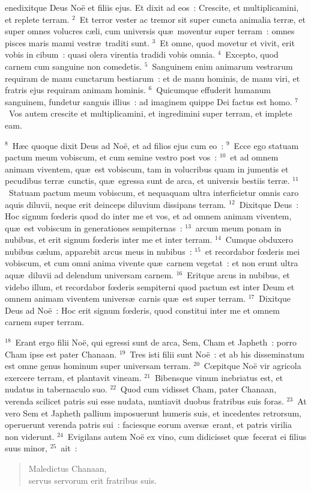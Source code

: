 \bchapter
{}enedixitque Deus No\"e et filiis ejus. Et dixit ad eos~: Crescite, et multiplicamini, et replete terram.
${}^{2}$~Et terror vester ac tremor sit super cuncta animalia terr\ae , et super omnes volucres c\ae li, cum universis qu\ae\ moventur super terram~: omnes pisces maris manui vestr\ae\ traditi sunt.
${}^{3}$~Et omne, quod movetur et vivit, erit vobis in cibum~: quasi olera virentia tradidi vobis omnia.
${}^{4}$~Excepto, quod carnem cum sanguine non comedetis.
${}^{5}$~Sanguinem enim animarum vestrarum requiram de manu cunctarum bestiarum~: et de manu hominis, de manu viri, et fratris ejus requiram animam hominis.
${}^{6}$~Quicumque effuderit humanum sanguinem, fundetur sanguis illius~: ad imaginem quippe Dei factus est homo.
${}^{7}$~Vos autem crescite et multiplicamini, et ingredimini super terram, et implete eam.


${}^{8}$~H\ae c quoque dixit Deus ad No\"e, et ad filios ejus cum eo~:
${}^{9}$~Ecce ego statuam pactum meum vobiscum, et cum semine vestro post vos~:
${}^{10}$~et ad omnem animam viventem, qu\ae\ est vobiscum, tam in volucribus quam in jumentis et pecudibus terr\ae\ cunctis, qu\ae\ egressa sunt de arca, et universis bestiis terr\ae .
${}^{11}$~Statuam pactum meum vobiscum, et nequaquam ultra interficietur omnis caro aquis diluvii, neque erit deinceps diluvium dissipans terram.
${}^{12}$~Dixitque Deus~: Hoc signum fœderis quod do inter me et vos, et ad omnem animam viventem, qu\ae\ est vobiscum in generationes sempiternas~:
${}^{13}$~arcum meum ponam in nubibus, et erit signum fœderis inter me et inter terram.
${}^{14}$~Cumque obduxero nubibus c\ae lum, apparebit arcus meus in nubibus~:
${}^{15}$~et recordabor fœderis mei vobiscum, et cum omni anima vivente qu\ae\ carnem vegetat~: et non erunt ultra aqu\ae\ diluvii ad delendum universam carnem.
${}^{16}$~Eritque arcus in nubibus, et videbo illum, et recordabor fœderis sempiterni quod pactum est inter Deum et omnem animam viventem univers\ae\ carnis qu\ae\ est super terram.
${}^{17}$~Dixitque Deus ad No\"e~: Hoc erit signum fœderis, quod constitui inter me et omnem carnem super terram.


${}^{18}$~Erant ergo filii No\"e, qui egressi sunt de arca, Sem, Cham et Japheth~: porro Cham ipse est pater Chanaan.
${}^{19}$~Tres isti filii sunt No\"e~: et ab his disseminatum est omne genus hominum super universam terram.
${}^{20}$~Cœpitque No\"e vir agricola exercere terram, et plantavit vineam.
${}^{21}$~Bibensque vinum inebriatus est, et nudatus in tabernaculo suo.
${}^{22}$~Quod cum vidisset Cham, pater Chanaan, verenda scilicet patris sui esse nudata, nuntiavit duobus fratribus suis foras.
${}^{23}$~At vero Sem et Japheth pallium imposuerunt humeris suis, et incedentes retrorsum, operuerunt verenda patris sui~: faciesque eorum avers\ae\ erant, et patris virilia non viderunt.
${}^{24}$~Evigilans autem No\"e ex vino, cum didicisset qu\ae\ fecerat ei filius suus minor,
${}^{25}$~ait~: \begin{verse}Maledictus Chanaan,\\ servus servorum erit fratribus suis.\end{verse}


